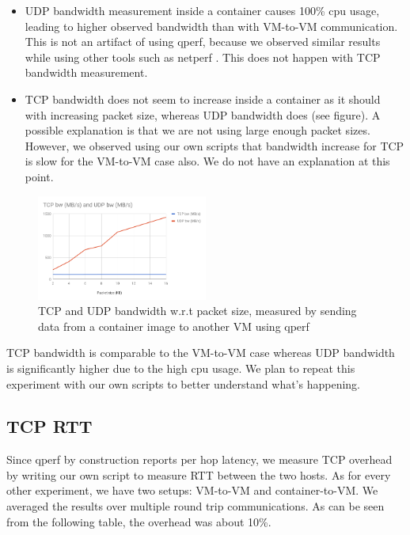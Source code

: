 \documentclass[letterpaper, 10 pt, conference]{ieeeconf}  %
\begin{document}
\begin{itemize}
\item UDP bandwidth measurement inside a container causes 100\% cpu usage, leading to higher observed bandwidth than with VM-to-VM communication. This is not an artifact of using qperf, because we observed similar results while using other tools such as netperf \cite{netperf}. This does not happen with TCP bandwidth measurement.
\item TCP bandwidth does not seem to increase inside a container as it should with increasing packet size, whereas UDP bandwidth does (see figure). A possible explanation is that we are not using large enough packet sizes. However, we observed using our own scripts that bandwidth increase for TCP is slow for the VM-to-VM case also. We do not have an explanation at this point.
\end{itemize}

\begin{figure}[h]
	\includegraphics[width=0.5\textwidth]{chart.png}
    \caption{TCP and UDP bandwidth w.r.t packet size, measured by sending data from a container image to another VM using qperf}
\end{figure}

TCP bandwidth is comparable to the VM-to-VM case whereas UDP bandwidth is significantly higher due to the high cpu usage. We plan to repeat this experiment with our own scripts to better understand what's happening.

\subsection{TCP RTT}

Since qperf by construction reports per hop latency, we measure TCP overhead by writing our own script to measure RTT between the two hosts. As for every other experiment, we have two setups: VM-to-VM and container-to-VM. We averaged the results over multiple round trip communications. As can be seen from the following table, the overhead was about 10\%.

\vspace{5pt}
\end{document}
